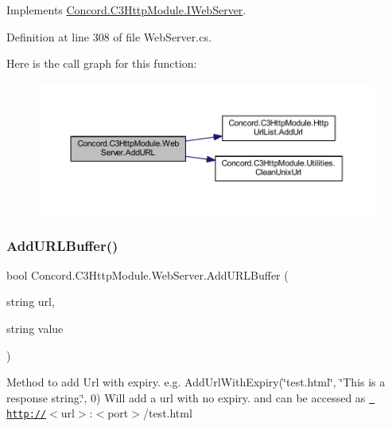 Implements \mbox{\hyperlink{interface_concord_1_1_c3_http_module_1_1_i_web_server_a4ebea56f3b1910ddf812d80045dbc6f2}{Concord.\+C3\+Http\+Module.\+I\+Web\+Server}}.



Definition at line 308 of file Web\+Server.\+cs.

Here is the call graph for this function\+:
\nopagebreak
\begin{figure}[H]
\begin{center}
\leavevmode
\includegraphics[width=350pt]{class_concord_1_1_c3_http_module_1_1_web_server_ad44fcb4fc6cac61ba3af5bbe28d79132_cgraph}
\end{center}
\end{figure}
\mbox{\label{class_concord_1_1_c3_http_module_1_1_web_server_a911477bcbed2ac2482ab9dafbdd33994}} 
\subsubsection{\texorpdfstring{AddURLBuffer()}{AddURLBuffer()}}
{\footnotesize\ttfamily bool Concord.\+C3\+Http\+Module.\+Web\+Server.\+Add\+U\+R\+L\+Buffer (\begin{DoxyParamCaption}\item[{string}]{url,  }\item[{string}]{value }\end{DoxyParamCaption})\hspace{0.3cm}{\ttfamily [inline]}}



Method to add Url with expiry. e.\+g. Add\+Url\+With\+Expiry(\char`\"{}test.\+html\char`\"{}, \char`\"{}\+This is a response string.\char`\"{}, 0) Will add a url with no expiry. and can be accessed as \href{http://}{\texttt{ http\+://}}$<$url$>$\+:$<$port$>$/test.html 


